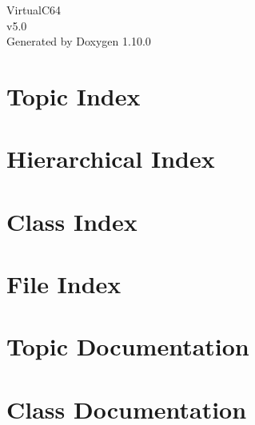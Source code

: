 \documentclass[twoside]{book}
\newcommand{\+}{\discretionary{\mbox{\scriptsize$\hookleftarrow$}}{}{}}
\newcommand{\clearemptydoublepage}{%
    \newpage{\pagestyle{empty}\cleardoublepage}%
  }
\begin{document}
  \raggedbottom
    \hypersetup{pageanchor=false,
                bookmarksnumbered=true,
                pdfencoding=unicode
               }
  \begin{titlepage}
  \vspace*{7cm}
  \begin{center}%
  {\Large Virtual\+C64}\\
  [1ex]\large v5.\+0 \\
  \vspace*{1cm}
  {\large Generated by Doxygen 1.10.0}\\
  \end{center}
  \end{titlepage}
  \clearemptydoublepage
  \tableofcontents
  \clearemptydoublepage
  \hypersetup{pageanchor=true}

\chapter{Topic Index}

\chapter{Hierarchical Index}

\chapter{Class Index}

\chapter{File Index}

\chapter{Topic Documentation}

\chapter{Class Documentation}


\end{document}
